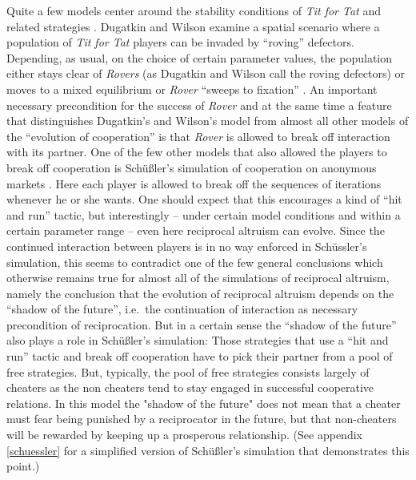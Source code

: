 Quite a few models center around the stability conditions of {\em Tit for Tat}
and related strategies \cite[]{dugatkin:1997}. Dugatkin and Wilson \cite[p.\ 
24]{dugatkin-wilson:1991} examine a spatial scenario where a population of
{\em Tit for Tat} players can be invaded by ``roving'' defectors. Depending,
as usual, on the choice of certain parameter values, the population either
stays clear of {\em Rovers} (as Dugatkin and Wilson call the roving defectors)
or moves to a mixed equilibrium or {\em Rover} ``sweeps to fixation'' \cite[p.\ 
694ff.]{dugatkin-wilson:1991}. An important necessary precondition for the
success of {\em Rover} and at the same time a feature that distinguishes
Dugatkin's and Wilson's model from almost all other models of the ``evolution
of cooperation'' is that {\em Rover} is allowed to break off interaction with
its partner. One of the few other models that also allowed the players to
break off cooperation is Schüßler's simulation of cooperation on anonymous
markets \cite[p.\  61ff.]{schuessler:1997}. Here each player is allowed to
break off the sequences of iterations whenever he or she wants. One should
expect that this encourages a kind of ``hit and run'' tactic, but
interestingly -- under certain model conditions and within a certain parameter
range -- even here reciprocal altruism can evolve. Since the continued
interaction between players is in no way enforced in Schüssler's simulation,
this seems to contradict one of the few general conclusions which otherwise
remains true for almost all of the simulations of reciprocal altruism, namely
the conclusion that the evolution of reciprocal altruism depends on the
``shadow of the future'', i.e.\ the continuation of interaction as
necessary precondition of reciprocation. But in a certain sense the ``shadow
of the future'' also plays a role in Schüßler's simulation: Those strategies
that use a ``hit and run'' tactic and break off cooperation have to pick their
partner from a pool of free strategies. But, typically, the pool of free
strategies consists largely of cheaters as the non cheaters tend to stay
engaged in successful cooperative relations. In this model the "shadow of the
future" does not mean that a cheater must fear being punished by a
reciprocator in the future, but that non-cheaters will be rewarded by keeping
up a prosperous relationship. (See appendix \ref{schuessler} for a simplified
version of Schüßler's simulation that demonstrates this point.)

